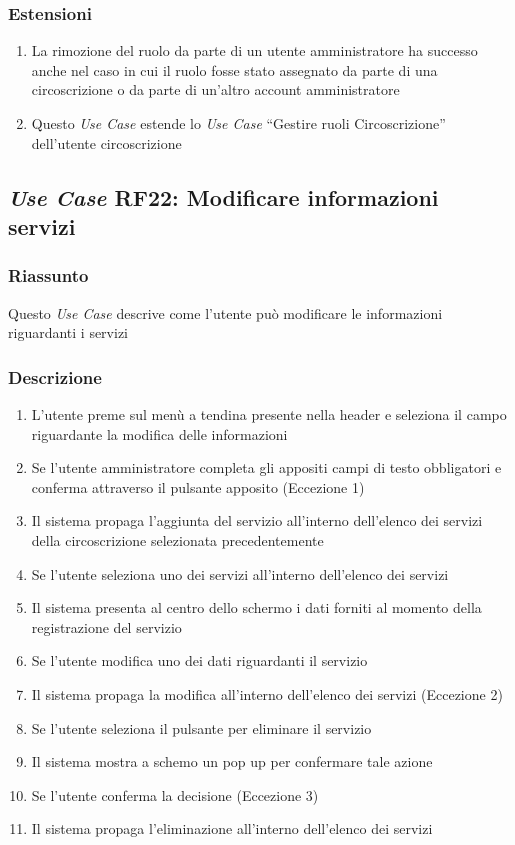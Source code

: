        \subsubsection{Estensioni}
            \begin{enumerate}
                \item La rimozione del ruolo da parte di un utente amministratore ha successo anche nel caso in cui il ruolo fosse stato assegnato da parte di una circoscrizione o da parte di un'altro account amministratore
                \item Questo \textit{Use Case} estende lo \textit{Use Case} ``Gestire ruoli Circoscrizione'' dell'utente circoscrizione
            \end{enumerate}

    \subsection{\textit{Use Case} RF22: Modificare informazioni servizi}
        \subsubsection{Riassunto}
        Questo \textit{Use Case} descrive come l'utente può modificare le informazioni riguardanti i servizi
        \subsubsection{Descrizione}
            \begin{enumerate}
                \item L'utente preme sul menù a tendina presente nella header e seleziona il campo riguardante la modifica delle informazioni
                \item Se l'utente amministratore completa gli appositi campi di testo obbligatori e conferma attraverso il pulsante apposito (Eccezione 1)
                \item Il sistema propaga l'aggiunta del servizio all'interno dell'elenco dei servizi della circoscrizione selezionata precedentemente
                \item Se l'utente seleziona uno dei servizi all'interno dell'elenco dei servizi
                \item Il sistema presenta al centro dello schermo i dati forniti al momento della registrazione del servizio
                \item Se l'utente modifica uno dei dati riguardanti il servizio
                \item Il sistema propaga la modifica all'interno dell'elenco dei servizi (Eccezione 2)
                \item Se l'utente seleziona il pulsante per eliminare il servizio
                \item Il sistema mostra a schemo un pop up per confermare tale azione
                \item Se l'utente conferma la decisione (Eccezione 3)
                \item Il sistema propaga l'eliminazione all'interno dell'elenco dei servizi
            \end{enumerate}
